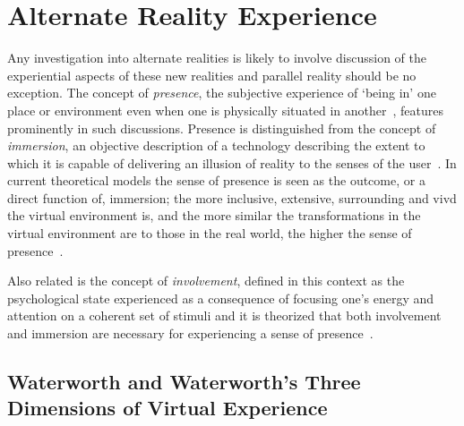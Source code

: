 
\section{Alternate Reality Experience}

\label{lit-review-presencec}
Any investigation into alternate realities is likely to involve discussion of the experiential aspects of these new realities and parallel reality should be no exception. The concept of \textit{presence}, the subjective experience of `being in' one place or environment even when one is physically situated in another~\cite{Witmer1998}, features prominently in such discussions. Presence is distinguished from the concept of \textit{immersion}, an objective description of a technology describing the extent to which it is capable of delivering an illusion of reality to the senses of the user~\cite{Slater1997}. In current theoretical models the sense of presence is seen as the outcome, or a direct function of, immersion; the more inclusive, extensive, surrounding and vivd the virtual environment is, and the more similar the transformations in the virtual environment are to those in the real world, the higher the sense of presence~\cite{Constantin2003}.

Also related is the concept of \textit{involvement}, defined in this context as the psychological state experienced as a consequence of focusing one's energy and attention on a coherent set of stimuli and it is theorized that both involvement and immersion are necessary for experiencing a sense of presence~\cite{Witmer1998}.

\subsection{Waterworth and Waterworth's Three Dimensions of Virtual Experience}
\label{waterworthandwaterworth}
\newcommand{\presencefootnote}{\footnote{\textbf{Presence} in the context of this model is defined as a state of heightened perceptual processing of environmental stimuli (\textit{``a psychological focus on direct perceptual processing''}~\cite{Waterworth2001}) accompanied by lessened conceptual reasoning, covering cases both in which the environmental stimuli originate from the subject's immediate real surroundings (\textit{unmediated presence}) and when the environmental stimuli originate from a remote real environment, virtual environment or mixed reality environment (\textit{mediated presence})~\cite{Mantovani2010}.}}

